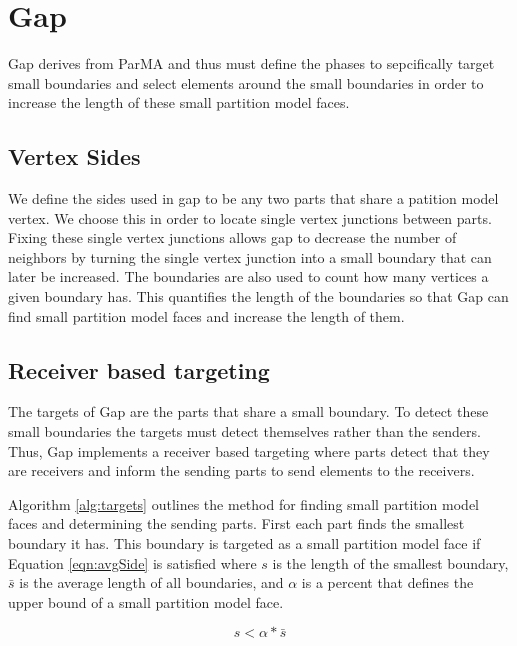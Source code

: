 \documentclass{thesis}
\begin{document}
  
\section{Gap}

Gap derives from ParMA and thus must define the phases to sepcifically target 
small boundaries and select elements around the small boundaries in order 
to increase the length of these small partition model faces. 

\subsection{Vertex Sides}

We define the sides used in gap to be any two parts that share a patition model 
vertex. We choose this in order to locate single vertex 
junctions between parts. Fixing these single vertex junctions allows gap to 
decrease the number of neighbors by turning the single vertex junction into 
a small boundary that can later be increased. The boundaries are also used 
to count how many vertices a given boundary has. This quantifies the length 
of the boundaries so that Gap can find small partition model faces and increase the length of them.

\subsection{Receiver based targeting}

The targets of Gap are the parts that share a small boundary. To detect 
these small boundaries the targets must detect themselves rather than the 
senders. Thus, Gap implements a receiver based targeting where parts detect 
that they are receivers and inform the sending parts to send elements to the 
receivers. 

Algorithm \ref{alg:targets} outlines the method for finding small partition 
model faces 
and determining the sending parts. First each part finds the smallest 
boundary it has. This boundary is targeted as a small partition model face if 
Equation 
\ref{eqn:avgSide} is satisfied where $s$ is the length of the smallest 
boundary, $\bar{s}$ is the average length of all boundaries, and $\alpha$ is 
a percent that defines the upper bound of a small partition model face. 

\begin{equation}
\label{eqn:avgSide}
s < \alpha * \bar{s}
\end{equation}
\end{document}

